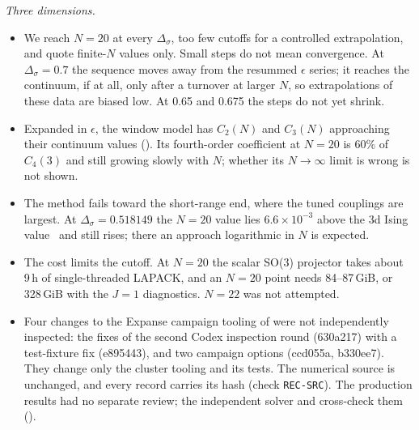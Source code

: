 \textit{Three dimensions.}
\begin{itemize}
\item We reach $N=20$ at every $\Delta_\sigma$, too few cutoffs for a controlled extrapolation, and quote finite-$N$
 values only. Small steps do not mean convergence. At $\Delta_\sigma=0.7$ the sequence moves away from the resummed
 $\epsilon$ series; it reaches the continuum, if at all, only after a turnover at larger $N$, so extrapolations of
 these data are biased low. At 0.65 and 0.675 the steps do not yet shrink.
\item Expanded in $\epsilon$, the window model has $C_2(N)$ and $C_3(N)$ approaching their continuum values
 (). Its fourth-order coefficient at $N=20$ is 60\% of $C_4(3)$ and still growing slowly with $N$;
 whether its $N\to\infty$ limit is wrong is not shown.
\item The method fails toward the short-range end, where the tuned couplings are largest. At $\Delta_\sigma=0.518149$
 the $N=20$ value lies $6.6\times10^{-3}$ above the 3d Ising value~\cite{Chang:2024whx} and still rises; there an
 approach logarithmic in $N$ is expected.
\item The cost limits the cutoff. At $N=20$ the scalar SO(3) projector takes about 9\,h of single-threaded LAPACK,
 and an $N=20$ point needs 84--87\,GiB, or 328\,GiB with the $J=1$ diagnostics. $N=22$ was not attempted.
\item Four changes to the Expanse campaign tooling of  were not independently inspected:
 the fixes of the second Codex inspection round (630a217) with a test-fixture fix (e895443), and two campaign options
 (ccd055a, b330ee7). They change only the cluster tooling and its tests. The numerical source is unchanged, and every
 record carries its hash (check \texttt{REC-SRC}). The production results had no separate review; the independent
 solver and  cross-check them ().
\end{itemize}
